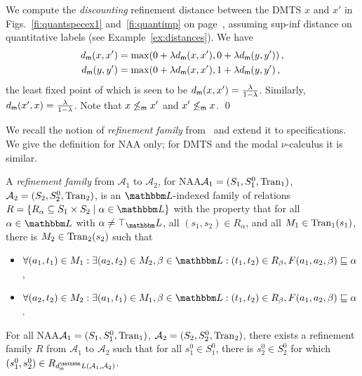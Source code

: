 \documentclass[twocolumn]{svjour3-dummy}
\newcommand*\NAA{NAA\xspace}
\newcommand*\mr{\le_\textup{\textsf{m}}}
\newcommand*\cA{\mathcal A}
\newcommand*\Tran{\textup{\textrm{Tran}}}
\newcommand*\LL{\mathbbm L}
\newcommand*\md{d_\textup{\textsf{m}}} \newcommand*\mdl{\smash{\md^\LL}}
\begin{document}
\begin{example}
  We compute the \emph{discounting} refinement distance between the DMTS
  $x$ and $x'$ in Figs.~\ref{fi:quantspecex1} and~\ref{fi:quantimp} on
  page~\pageref{fi:quantspecex1}, assuming sup-inf distance on
  quantitative labels (see Example~\ref{ex:distances}).  We have
  \begin{align*}
    \md( x, x') &= \max( 0+ \lambda \md( x, x'), 0+ \lambda \md( y,
    y'))\,, \\
    \md( y, y') &= \max( 0+ \lambda \md( x, x'), 1+ \lambda \md( y,
    y')\,,
  \end{align*}
  the least fixed point of which is seen to be $\md( x, x')= \frac{
    \lambda}{ 1- \lambda}$.  Similarly, $\md( x', x)= \frac{ \lambda}{
    1- \lambda}$.  Note that $x\not\mr x'$ and $x'\not\mr x$. \qed
\end{example}

We recall the notion of \emph{refinement family}
from~\cite[Def.~6]{DBLP:journals/acta/FahrenbergL14} and extend it to
specifications.  We give the definition for \NAA only; for DMTS and
the modal $\nu$-calculus it is similar.

\begin{definition}
  \label{de:reffam}
  A \emph{refinement family} from $\cA_1$ to $\cA_2$, for \NAA $\cA_1=(
  S_1, S^0_1, \Tran_1)$, $\cA_2=( S_2, S^0_2, \Tran_2)$, is an
  $\LL$-indexed family of relations $R=\{ R_\alpha\subseteq S_1\times
  S_2\mid \alpha\in \LL\}$ with the property that for all $\alpha\in
  \LL$ with $\alpha\ne \top_\LL$, all $( s_1, s_2)\in R_\alpha$, and all
  $M_1\in \Tran_1( s_1)$, there is $M_2\in \Tran_2( s_2)$ such that
  \begin{itemize}
  \item $\forall( a_1, t_1)\in M_1: \exists( a_2, t_2)\in M_2, \beta\in
    \LL:( t_1, t_2)\in R_\beta, F( a_1, a_2, \beta)\sqsubseteq \alpha$,
  \item $\forall( a_2, t_2)\in M_2: \exists( a_1, t_1)\in M_1, \beta\in
    \LL:( t_1, t_2)\in R_\beta, F( a_1, a_2, \beta)\sqsubseteq \alpha$.
  \end{itemize}
\end{definition}

\begin{lemma}
  For all \NAA $\cA_1=( S_1, S^0_1, \Tran_1)$, $\cA_2=( S_2, S^0_2,
  \Tran_2)$, there exists a refinement family $R$ from $\cA_1$ to
  $\cA_2$ such that for all $s^0_1\in S^0_1$, there is $s^0_2\in S^0_2$
  for which $( s^0_1, s^0_2)\in R_{ \mdl( \cA_1, \cA_2)}$.
\end{lemma}
\end{document}
